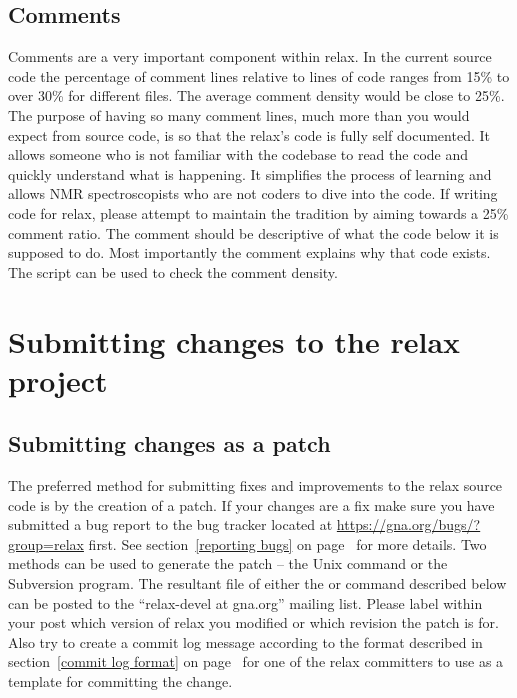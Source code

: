 \subsection{Comments}

Comments are a very important component within relax.  In the current source code the percentage of comment lines relative to lines of code ranges from 15\% to over 30\% for different files.  The average comment density would be close to 25\%.  The purpose of having so many comment lines, much more than you would expect from source code, is so that the relax's code is fully self documented.  It allows someone who is not familiar with the codebase to read the code and quickly understand what is happening.  It simplifies the process of learning and allows NMR spectroscopists who are not coders to dive into the code.  If writing code for relax, please attempt to maintain the tradition by aiming towards a 25\% comment ratio.  The comment should be descriptive of what the code below it is supposed to do.  Most importantly the comment explains why that code exists.  The script  can be used to check the comment density.




\section{Submitting changes to the relax project}


\subsection{Submitting changes as a patch}

The preferred method for submitting fixes and improvements to the relax source code is by the creation of a patch.  If your changes are a fix make sure you have submitted a bug report to the bug tracker located at \href{https://gna.org/bugs/?group=relax}{https://gna.org/bugs/?group=relax} first.  See section~\ref{reporting bugs} on page~\pageref{reporting bugs} for more details.  Two methods can be used to generate the patch -- the Unix command  or the Subversion program.  The resultant file  of either the  or  command described below can be posted to the ``relax-devel at gna.org'' mailing list.  Please label within your post which version of relax you modified or which revision the patch is for.  Also try to create a commit log message according to the format described in section~\ref{commit log format} on page~\pageref{commit log format} for one of the relax committers to use as a template for committing the change.



